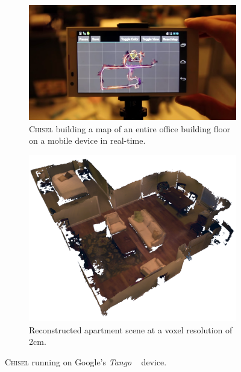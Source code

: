 \documentclass[conference]{IEEEtran}
\newcommand{\Tango}{\textit{Tango} }
\newcommand{\chisel}{\textsc{Chisel}\xspace}
\begin{document}
\begin{figure}[t!]
  \centering
    	 \begin{subfigure}{\linewidth} \centering
		 \includegraphics[width=1\textwidth]{img/mapdevice}
		 \caption{\chisel building a map
      of an entire office building floor on a mobile device in real-time.}
		 \label{fig:map_device}
	 \end{subfigure}
      	 \begin{subfigure}{\linewidth} \centering
		 \includegraphics[width=1\textwidth]{img/apartment_scene_color.png}
		 \caption{Reconstructed apartment scene at a voxel resolution of 2cm.}
		 \label{fig:apartment_color}
	 \end{subfigure}
      \caption{\chisel running on Google's \Tango~\cite{Tango} device.}
  \label{fig:first_figure}
\end{figure} 
\end{document}
